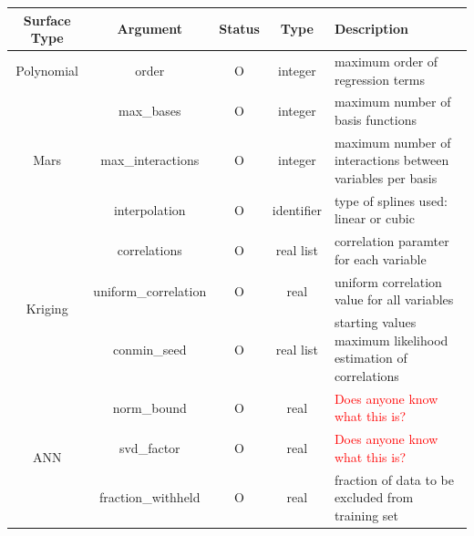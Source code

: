 \documentclass{article}
\begin{document}
\pagebreak

\begin{table}[h]
  \newcommand\T{\rule{0pt}{2.6ex}}
  \newcommand\B{\rule[-1.2ex]{0pt}{0pt}}
  \centering
  \begin{tabular}{|c|c|c|c|p{8cm}|}
  \hline
  {\bf Surface Type} & {\bf Argument} & {\bf Status} & {\bf Type} & {\bf Description} \\
  \hline
  Polynomial & order & O & integer & maximum order of regression terms \\
  \hline
  \multirow{3}{*}{Mars} & max\_bases & O & integer & maximum number of basis functions \\
  \cline{2-5}
   & max\_interactions & O & integer & maximum number of interactions between variables per basis \\
  \cline{2-5}
   & interpolation & O & identifier & type of splines used: linear or cubic \\
  \hline
  

  \multirow{3}{*}{Kriging} & correlations & O & real list & correlation paramter for each variable \\ 
  \cline{2-5}
   & uniform\_correlation & O & real & uniform correlation value for all variables \\ 
  \cline{2-5}
   & conmin\_seed & O & real list & starting values maximum likelihood estimation of correlations \\
  \hline 
  
  \multirow{3}{*}{ANN} & norm\_bound & O & real & \textcolor{red}{Does anyone know what this is?}\\ 
  \cline{2-5}
   & svd\_factor & O & real & \textcolor{red}{Does anyone know what this is?}\\ 
  \cline{2-5}
   & fraction\_withheld & O & real & fraction of data to be excluded from training set \\
   \hline 
  \end{tabular}
\end{table}
  

\end{document}
